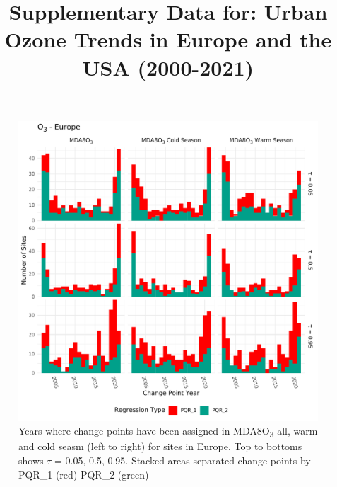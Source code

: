 \documentclass{article}
\title{Supplementary Data for: Urban Ozone Trends in Europe and the USA (2000-2021)}
\date{}
\begin{document}
\maketitle
\clearpage



\begin{figure}[p]
\centering
\includegraphics[width=\linewidth]{figures/si_figures/fS01_cp_year_o3_Europe.pdf}
\caption{Years where change points have been assigned in MDA8O\textsubscript{3} all, warm and cold seasm (left to right) for sites in Europe. Top to bottoms shows $\tau$ = 0.05, 0.5, 0.95. Stacked areas separated change points by PQR\_1 (red) PQR\_2 (green)}
\label{si_fig:cp_year_eu}
\end{figure}
\clearpage
\end{document}
